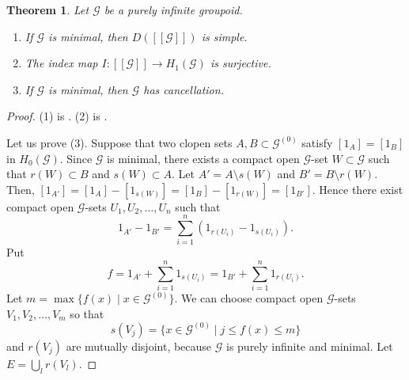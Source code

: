 \documentclass[11pt]{article}
\newtheorem{theorem}{Theorem}[section]
\theoremstyle{definition}
\numberwithin{equation}{section}
\newcommand{\G}{\mathcal{G}}
\begin{document}
\begin{theorem}\label{pi}
Let $\G$ be a purely infinite groupoid. 
\begin{enumerate}
\item If $\G$ is minimal, then $D([[\G]])$ is simple. 
\item The index map $I:[[\G]]\to H_1(\G)$ is surjective. 
\item If $\G$ is minimal, then $\G$ has cancellation. 
\end{enumerate}
\end{theorem}
\begin{proof}
(1) is \cite[Theorem 4.16]{M15crelle}. 
(2) is \cite[Theorem 5.2]{M15crelle}. 

Let us prove (3). 
Suppose that 
two clopen sets $A,B\subset\G^{(0)}$ satisfy $[1_A]=[1_B]$ in $H_0(\G)$. 
Since $\G$ is minimal, 
there exists a compact open $\G$-set $W\subset\G$ 
such that $r(W)\subset B$ and $s(W)\subset A$. 
Let $A'=A\setminus s(W)$ and $B'=B\setminus r(W)$. 
Then, $[1_{A'}]=[1_A]-[1_{s(W)}]=[1_B]-[1_{r(W)}]=[1_{B'}]$. 
Hence there exist compact open $\G$-sets $U_1,U_2,\dots,U_n$ 
such that 
\[
1_{A'}-1_{B'}=\sum_{i=1}^n\left(1_{r(U_i)}-1_{s(U_i)}\right). 
\]
Put 
\[
f=1_{A'}+\sum_{i=1}^n1_{s(U_i)}=1_{B'}+\sum_{i=1}^n1_{r(U_i)}. 
\]
Let $m=\max\{f(x)\mid x\in\G^{(0)}\}$. 
We can choose compact open $\G$-sets $V_1,V_2,\dots,V_m$ so that 
\[
s(V_j)=\{x\in\G^{(0)}\mid j\leq f(x)\leq m\}
\]
and $r(V_j)$ are mutually disjoint, 
because $\G$ is purely infinite and minimal. 
Let $E=\bigcup_lr(V_l)$. 


\end{proof}
\end{document}
